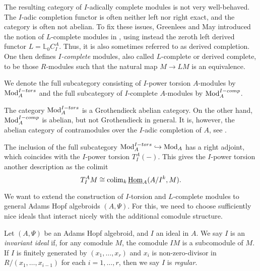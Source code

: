 \begin{remark}
    \label{ch0:rm:I-complete-vs-I-adically-complete}
    The resulting category of $I$-adically complete modules is not very well-behaved. The $I$-adic completion functor is often neither left nor right exact, and the category is often not abelian. To fix these issues, Greenlees and May introduced the notion of $L$-complete modules in \cite{greenlees-may_92}, using instead the zeroth left derived functor $L=\mathbb{L}_0 C_I^A$. Thus, it is also sometimes referred to as derived completion. One then defines \emph{$I$-complete} modules, also called $L$-complete or derived complete, to be those $R$-modules such that the natural map $M\longrightarrow L M$ is an equivalence. 
\end{remark}

\begin{notation}
    We denote the full subcategory consisting of $I$-power torsion $A$-modules by $\mathrm{Mod}_A^{I-tors}$ and the full subcategory of $I$-complete $A$-modules by $\mathrm{Mod}_A^{I-comp}$. 
\end{notation}

\begin{remark}
    The category $\mathrm{Mod}_A^{I-tors}$ is a Grothendieck abelian category. On the other hand, $\mathrm{Mod}_A^{I-comp}$ is abelian, but not Grothendieck in general. It is, however, the abelian category of contramodules over the $I$-adic completion of $A$, see \cite{positselski_2022_contramodules}. \citeme
\end{remark}

The inclusion of the full subcategory $\mathrm{Mod}_A^{I-tors}\hookrightarrow \mathrm{Mod}_A$ has a right adjoint, which coincides with the $I$-power torsion $T_I^A(-)$. This gives the $I$-power torsion another description as the colimit 
$$T_I^A M \cong \operatorname{colim}_k \operatorname{\underline{Hom}}_A (A/I^k, M).$$

We want to extend the construction of $I$-torsion and $L$-complete modules to general Adams Hopf algebroids $(A,\Psi)$. For this, we need to choose sufficiently nice ideals that interact nicely with the additional comodule structure. 

\begin{definition}
    Let $(A, \Psi)$ be an Adams Hopf algebroid, and $I$ an ideal in $A$. We say $I$ is an \emph{invariant ideal} if, for any comodule $M$, the comodule $IM$ is a subcomodule of $M$. If $I$ is finitely generated by $(x_1, \ldots, x_r)$ and $x_i$ is non-zero-divisor in $R/(x_1, \ldots, x_{i-1})$ for each $i=1, \ldots, r$, then we say $I$ is \emph{regular}. 
\end{definition}

